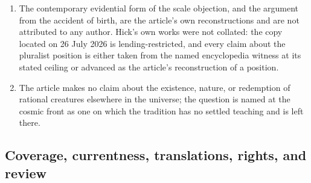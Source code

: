 \begin{enumerate}
\item The contemporary evidential form of the scale objection, and the argument from the accident of birth, are the article's own reconstructions and are not attributed to any author. Hick's own works were not collated: the copy located on 26 July 2026 is lending-restricted, and every claim about the pluralist position is either taken from the named encyclopedia witness at its stated ceiling or advanced as the article's reconstruction of a position.
\item The article makes no claim about the existence, nature, or redemption of rational creatures elsewhere in the universe; the question is named at the cosmic front as one on which the tradition has no settled teaching and is left there.
\end{enumerate}

\subsection{Coverage, currentness, translations, rights, and review}


